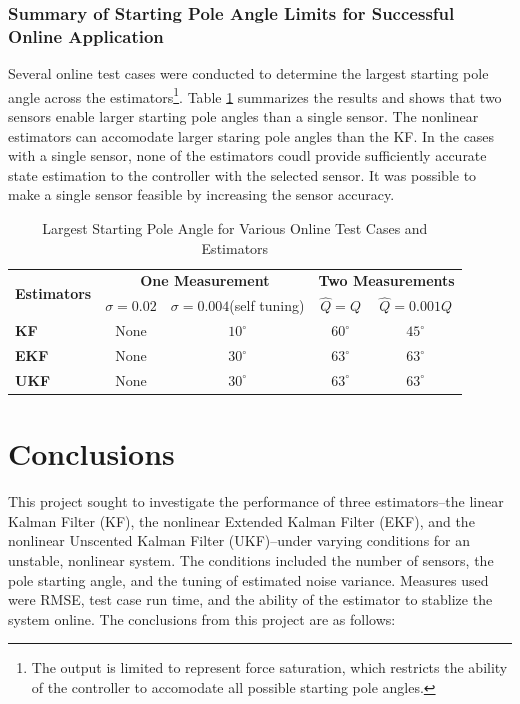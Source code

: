 \documentclass{article}
\begin{document}
\subsubsection{Summary of Starting Pole Angle Limits for Successful Online Application}
Several online test cases were conducted to determine the largest starting pole angle across the estimators\footnote{The output is limited to represent force saturation, which restricts the ability of the controller to accomodate all possible starting pole angles.}. Table \ref{table:offlinecases} summarizes the results and shows that two sensors enable larger starting pole angles than a single sensor.  The nonlinear estimators can accomodate larger staring pole angles than the KF.  In the cases with a single sensor, none of the estimators coudl provide sufficiently accurate state estimation to the controller with the selected sensor.  It was possible to make a single sensor feasible by increasing the sensor accuracy.
\begin{table}[h!]
	\centering
	\renewcommand{\arraystretch}{1.5}
	\begin{tabular}{ |l |c  |c |c | c|}
		\hline
		\multirow{2}{*}{\textbf{Estimators}} & \multicolumn{2}{|c|}{\textbf{One Measurement}} & \multicolumn{2}{|c|}{\textbf{Two Measurements}} \\ \cline{2-5}
		& $\sigma = 0.02$ & $\sigma=0.004$(self tuning) & $\hat{Q} = Q$ & $\hat{Q} = 0.001Q$ \\ \hline
		\textbf{KF} & None & $10^\circ{}$ & $60^\circ{}$ & $45^\circ{}$ \\ \hline
		\textbf{EKF} & None & $30^\circ{}$ & $63^\circ{}$ & $63^\circ{}$ \\ \hline
		\textbf{UKF} & None & $30^\circ{}$ & $63^\circ{}$ & $63^\circ{}$ \\ \hline
	\end{tabular}
	\caption{Largest Starting Pole Angle for Various Online Test Cases and Estimators}
	\label{table:offlinecases}
\end{table}


\section{Conclusions}

This project sought to investigate the performance of three estimators--the linear Kalman Filter (KF), the nonlinear Extended Kalman Filter (EKF), and the nonlinear Unscented Kalman Filter (UKF)--under varying conditions for an unstable, nonlinear system.  The conditions included the number of sensors, the pole starting angle, and the tuning of estimated noise variance.  Measures used were RMSE, test case run time, and the ability of the estimator to stablize the system online.  The conclusions from this project are as follows:
\end{document}
